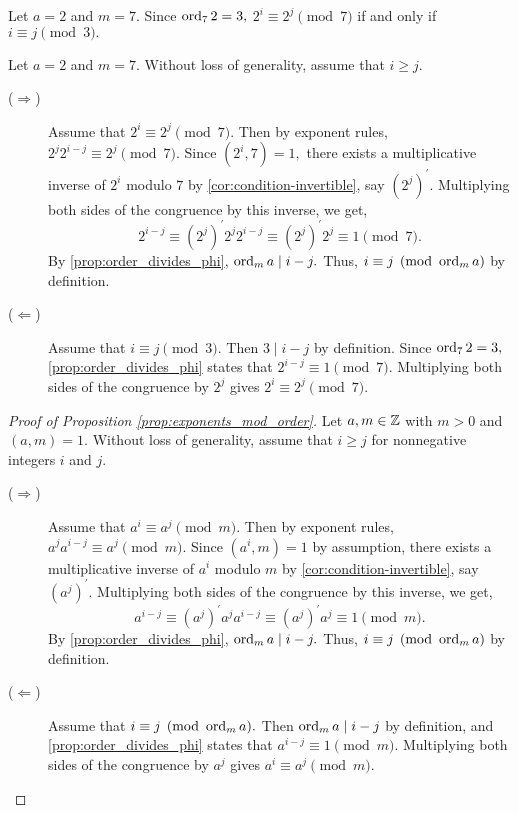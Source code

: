 \documentclass{ximera}
\begin{document}
\begin{example}
    Let $a=2$ and $m=7.$ Since $\operatorname{ord}_7 2=3,$ $2^i\equiv 2^j\pmod{7}$ if and only if $i\equiv j\pmod{3}.$


    \begin{sketch}
        Let $a=2$ and $m=7.$ Without loss of generality, assume that $i\geq j.$ 

        \begin{description}
            \item[($\Rightarrow$)] Assume that $2^i\equiv 2^j\pmod{7}.$ Then by exponent rules, $2^j 2^{i-j}\equiv 2^j\pmod{7}.$ Since $(2^i,7)=1,$ there exists a multiplicative inverse of $2^i$ modulo $7$ by \cref{cor:condition-invertible}, say $(2^j)^\prime$. Multiplying both sides of the congruence by this inverse, we get, \[2^{i-j}\equiv (2^j)^\prime 2^j 2^{i-j}\equiv (2^j)^\prime 2^j\equiv 1\pmod{7}.\]
            By \cref{prop:order_divides_phi}, $\operatorname{ord}_m a\mid i-j.$ Thus, $i\equiv j\pmod{\operatorname{ord}_m a}$ by definition.

            \item[($\Leftarrow$)] Assume that $i\equiv j\pmod{3}.$ Then $3\mid i-j$ by definition. Since $\operatorname{ord}_7 2=3,$ \cref{prop:order_divides_phi} states that $2^{i-j}\equiv 1\pmod{7}.$ Multiplying both sides of the congruence by $2^j$ gives $2^i\equiv 2^j\pmod{7}.$ 
        \end{description}
    \end{sketch}
\end{example}


\begin{proof}[Proof of Proposition \autoref{prop:exponents_mod_order}]
    Let $a,m\in\mathbb Z$ with $m>0$ and $(a,m)=1.$ Without loss of generality, assume that $i\geq j$ for nonnegative integers $i$ and $j.$ 

        \begin{description}
            \item[($\Rightarrow$)] Assume that $a^i\equiv a^j\pmod{m}.$ Then by exponent rules, $a^j a^{i-j}\equiv a^j\pmod{m}.$ Since $(a^i,m)=1$ by assumption, there exists a multiplicative inverse of $a^i$ modulo $m$ by \cref{cor:condition-invertible}, say $(a^j)^\prime$. Multiplying both sides of the congruence by this inverse, we get, \[a^{i-j}\equiv (a^j)^\prime a^j a^{i-j}\equiv (a^j)^\prime a^j\equiv 1\pmod{m}.\]
            By \cref{prop:order_divides_phi}, $\operatorname{ord}_m a\mid i-j.$ Thus, $i\equiv j\pmod{\operatorname{ord}_m a}$ by definition.

            \item[($\Leftarrow$)] Assume that $i\equiv j\pmod{\operatorname{ord}_m a}.$ Then $\operatorname{ord}_m a\mid i-j$ by definition, and \cref{prop:order_divides_phi} states that $a^{i-j}\equiv 1\pmod{m}.$ Multiplying both sides of the congruence by $a^j$ gives $a^i\equiv a^j\pmod{m}.$ 
        \end{description}
\end{proof}

\end{document}
